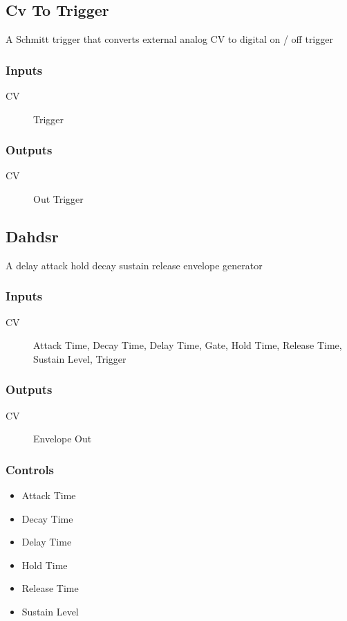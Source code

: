\subsection{Cv To Trigger}

A Schmitt trigger that converts external analog CV to digital on / off trigger



\subsubsection{Inputs}
\begin{description}
\item [CV] Trigger
\end{description}

\subsubsection{Outputs}
\begin{description}
\item [CV] Out Trigger
\end{description}

\subsection{Dahdsr}

A delay attack hold decay sustain release envelope generator



\subsubsection{Inputs}
\begin{description}
\item [CV] Attack Time, Decay Time, Delay Time, Gate, Hold Time, Release Time, Sustain Level, Trigger
\end{description}

\subsubsection{Outputs}
\begin{description}
\item [CV] Envelope Out
\end{description}

\subsubsection{Controls}
\begin{itemize}
\item Attack Time
\item Decay Time
\item Delay Time
\item Hold Time
\item Release Time
\item Sustain Level
\end{itemize}

